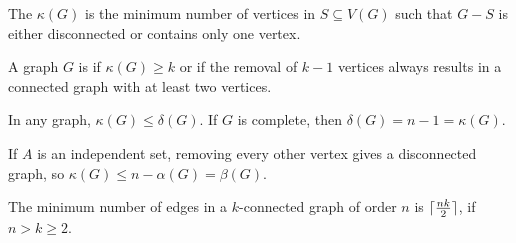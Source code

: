 
\begin{definition}
  The  $\kappa(G)$ is the minimum number of vertices
  in $S \subseteq V(G)$ such that $G - S$ is either disconnected or contains
  only one vertex.
\end{definition}

\begin{definition}
  A graph $G$ is  if $\kappa(G) \ge k$ or if the removal of
  $k-1$ vertices always results in a connected graph with at least two vertices.
\end{definition}

\begin{remark}
  In any graph, $\kappa(G) \le \delta(G)$.
  If $G$ is complete, then $\delta(G) = n-1 = \kappa(G)$.
\end{remark}

\begin{remark}
  If $A$ is an independent set, removing every other vertex gives a disconnected
  graph, so $\kappa(G) \le n-\alpha(G) = \beta(G)$.
\end{remark}

\begin{theorem}
  The minimum number of edges in a $k$-connected graph of order $n$ is
  $\lceil \frac{nk}{2} \rceil$, if $n > k \ge 2$.
\end{theorem}

